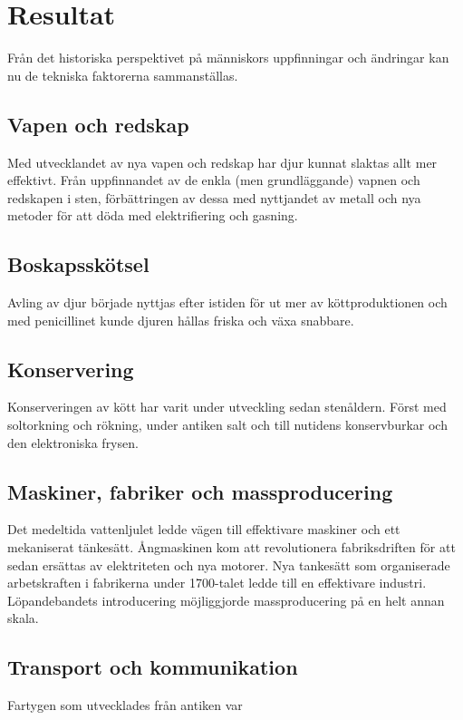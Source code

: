\section{Resultat}
Från det historiska perspektivet på människors uppfinningar och ändringar kan nu de tekniska faktorerna sammanställas. 

\subsection{Vapen och redskap}
Med utvecklandet av nya vapen och redskap har djur kunnat slaktas allt mer effektivt. Från uppfinnandet av de enkla (men grundläggande) vapnen och redskapen i sten, förbättringen av dessa med nyttjandet av metall och nya metoder för att döda med elektrifiering och gasning. 

\subsection{Boskapsskötsel}
Avling av djur började nyttjas efter istiden för ut mer av köttproduktionen och med penicillinet kunde djuren hållas friska och växa snabbare.  

\subsection{Konservering}
Konserveringen av kött har varit under utveckling sedan stenåldern. Först med soltorkning och rökning, under antiken salt och till nutidens konservburkar och den elektroniska frysen.   

\subsection{Maskiner, fabriker och massproducering}
Det medeltida vattenljulet ledde vägen till effektivare maskiner och ett mekaniserat tänkesätt. Ångmaskinen kom att revolutionera fabriksdriften för att sedan ersättas av elektriteten och nya motorer. 
\newline
\newline
Nya tankesätt som organiserade arbetskraften i fabrikerna under 1700-talet ledde till en effektivare industri. Löpandebandets introducering möjliggjorde massproducering på en helt annan skala. 

\subsection{Transport och kommunikation}
Fartygen som utvecklades från antiken var 
